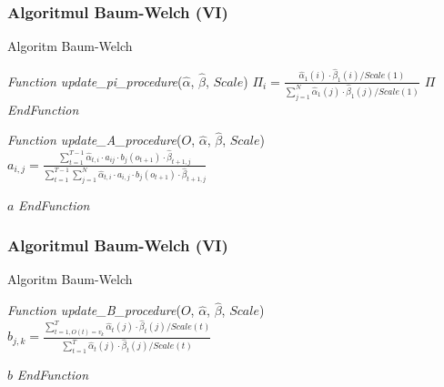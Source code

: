 \begin{frame}[fragile, t]
	\frametitle{Algoritmul Baum-Welch (VI)}	
	\begin{algorithm}[H]
		\scriptsize
      	\caption{Algoritm Baum-Welch}
      	\label{alg-baum-welch}
      	 
      	\begin{algorithmic}[1]
      		\STATE \emph{Function update\_pi\_procedure}($\hat{\alpha}$, $\hat{\beta}$, $Scale$)
					\STATE $\Pi_i = \frac{\hat{\alpha}_1(i) \cdot \hat{\beta}_1(i) / Scale(1)}
										{\sum_{j=1}^{N}{\hat{\alpha}_1(j) \cdot \hat{\beta}_1(j) / Scale(1)}}$
				\ENDFOR
				\RETURN $\Pi$
      		\STATE \emph{EndFunction}
			
			\vspace*{0.5em} 
      		\STATE \emph{Function update\_A\_procedure}($O$, $\hat{\alpha}$, $\hat{\beta}$, $Scale$)
					\STATE $a_{i,j} = \frac{\sum_{t=1}^{T-1}{\hat{\alpha}_{t,i}\cdot a_{ij} \cdot b_j(o_{t+1}) 
												\cdot \hat{\beta}_{t+1,j}}}
										{\sum_{t=1}^{T-1}\sum_{j=1}^{N}{\hat{\alpha}_{t,i}\cdot a_{i,j} 
										\cdot b_j(o_{t+1}) \cdot \hat{\beta}_{t+1,j}}}$
					\ENDFOR
				\ENDFOR
				
				\RETURN $a$
      		\STATE \emph{EndFunction}
		\end{algorithmic}
	\end{algorithm}  
\end{frame}


\begin{frame}[fragile]
	\frametitle{Algoritmul Baum-Welch (VI)}	
	\begin{algorithm}[H]
		\scriptsize
      	\caption{Algoritm Baum-Welch}
      	\label{alg-baum-welch}
      	 
      	\begin{algorithmic}[1]
      		\STATE \emph{Function update\_B\_procedure}($O$, $\hat{\alpha}$, $\hat{\beta}$, $Scale$)
					\STATE $b_{j,k} = \frac{\sum_{t=1,O(t)=v_k}^{T}
											{\hat{\alpha}_t(j) \cdot \hat{\beta}_t(j) / Scale(t)}}
										   {\sum_{t=1}^{T}
											{\hat{\alpha}_t(j) \cdot \hat{\beta}_t(j) / Scale(t)}}$
					\ENDFOR
				\ENDFOR
				
				\RETURN $b$
      		\STATE \emph{EndFunction}
		\end{algorithmic}
	\end{algorithm}  
\end{frame}


